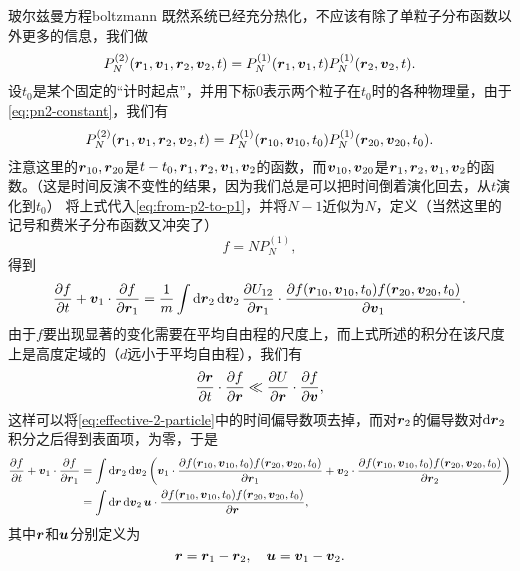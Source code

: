 \begin{back}{玻尔兹曼方程}{boltzmann}
    既然系统已经充分热化，不应该有除了单粒子分布函数以外更多的信息，我们做
    \begin{equation}
        P^{(2)}_N(\vb*{r}_1, \vb*{v}_1, \vb*{r}_2, \vb*{v}_2, t) = P^{(1)}_N(\vb*{r}_1, \vb*{v}_1, t) P^{(1)}_N(\vb*{r}_2, \vb*{v}_2, t).
    \end{equation}
    设$t_0$是某个固定的“计时起点”，并用下标0表示两个粒子在$t_0$时的各种物理量，由于\eqref{eq:pn2-constant}，我们有
    \[
        P^{(2)}_N(\vb*{r}_1, \vb*{v}_1, \vb*{r}_2, \vb*{v}_2, t) = P^{(1)}_N(\vb*{r}_{10}, \vb*{v}_{10}, t_0) P^{(1)}_N(\vb*{r}_{20}, \vb*{v}_{20}, t_0).
    \]
    注意这里的$\vb*{r}_{10}, \vb*{r}_{20}$是$t-t_0,\vb*{r}_1,\vb*{r}_2,\vb*{v}_1, \vb*{v}_2$的函数，而$\vb*{v}_{10}, \vb*{v}_{20}$是$\vb*{r}_1,\vb*{r}_2,\vb*{v}_1, \vb*{v}_2$的函数。（这是时间反演不变性的结果，因为我们总是可以把时间倒着演化回去，从$t$演化到$t_0$）
    将上式代入\eqref{eq:from-p2-to-p1}，并将$N-1$近似为$N$，定义（当然这里的记号和费米子分布函数又冲突了）
    \begin{equation}
        f=NP_N^{(1)},
    \end{equation}
    得到
    \[
        \pdv{f}{t} + \vb*{v}_1 \cdot \pdv{f}{\vb*{r}_1} = \frac{1}{m} \int \dd{\vb*{r}_2} \dd{\vb*{v}_2} \pdv{U_{12}}{\vb*{r}_1} \cdot \pdv{f(\vb*{r}_{10}, \vb*{v}_{10}, t_0) f(\vb*{r}_{20}, \vb*{v}_{20}, t_0)}{\vb*{v}_1}.
    \]
    由于$f$要出现显著的变化需要在平均自由程的尺度上，而上式所述的积分在该尺度上是高度定域的（$d$远小于平均自由程），我们有
    \[
        \pdv{\vb*{r}}{t} \cdot \pdv{f}{\vb*{r}} \ll \pdv{U}{\vb*{r}} \cdot \pdv{f}{\vb*{v}},
    \]
    这样可以将\eqref{eq:effective-2-particle}中的时间偏导数项去掉，而对$\vb*{r}_2$的偏导数对$\dd{\vb*{r}_2}$积分之后得到表面项，为零，于是
    \[
        \begin{aligned}
            \pdv{f}{t} + \vb*{v}_1 \cdot \pdv{f}{\vb*{r}_1} &= \int \dd{\vb*{r}_2} \dd{\vb*{v}_2} \left( \vb*{v}_1 \cdot \pdv{f(\vb*{r}_{10}, \vb*{v}_{10}, t_0) f(\vb*{r}_{20}, \vb*{v}_{20}, t_0)}{\vb*{r}_1} + \vb*{v}_2 \cdot \pdv{f(\vb*{r}_{10}, \vb*{v}_{10}, t_0) f(\vb*{r}_{20}, \vb*{v}_{20}, t_0)}{\vb*{r}_2} \right) \\
            &= \int \dd{\vb*{r}} \dd{\vb*{v}_2} \vb*{u} \cdot \pdv{f(\vb*{r}_{10}, \vb*{v}_{10}, t_0) f(\vb*{r}_{20}, \vb*{v}_{20}, t_0)}{\vb*{r}},
        \end{aligned}
    \]
    其中$\vb*{r}$和$\vb*{u}$分别定义为
    \begin{equation}
        \vb*{r} = \vb*{r}_1 - \vb*{r}_2, \quad \vb*{u} = \vb*{v}_1 - \vb*{v}_2.

\end{equation}
\end{back}
